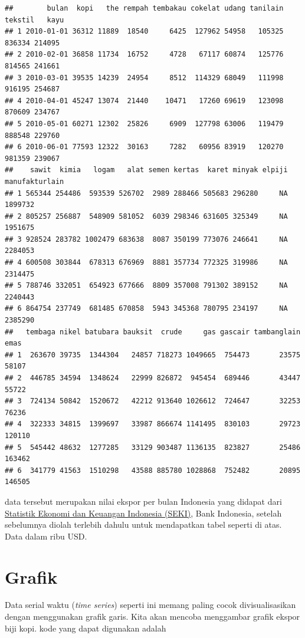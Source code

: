 \documentclass[
]{book}
\begin{document}
\begin{verbatim}
##        bulan  kopi   the rempah tembakau cokelat udang tanilain tekstil   kayu
## 1 2010-01-01 36312 11889  18540     6425  127962 54958   105325  836334 214095
## 2 2010-02-01 36858 11734  16752     4728   67117 60874   125776  814565 241661
## 3 2010-03-01 39535 14239  24954     8512  114329 68049   111998  916195 254687
## 4 2010-04-01 45247 13074  21440    10471   17260 69619   123098  870609 234767
## 5 2010-05-01 60271 12302  25826     6909  127798 63006   119479  888548 229760
## 6 2010-06-01 77593 12322  30163     7282   60956 83919   120270  981359 239067
##    sawit  kimia   logam   alat semen kertas  karet minyak elpiji manufakturlain
## 1 565344 254486  593539 526702  2989 288466 505683 296280     NA        1899732
## 2 805257 256887  548909 581052  6039 298346 631605 325349     NA        1951675
## 3 928524 283782 1002479 683638  8087 350199 773076 246641     NA        2284053
## 4 600508 303844  678313 676969  8881 357734 772325 319986     NA        2314475
## 5 788746 332051  654923 677666  8809 357008 791302 389152     NA        2240443
## 6 864754 237749  681485 670858  5943 345368 780795 234197     NA        2385290
##   tembaga nikel batubara bauksit  crude     gas gascair tambanglain   emas
## 1  263670 39735  1344304   24857 718273 1049665  754473       23575  58107
## 2  446785 34594  1348624   22999 826872  945454  689446       43447  55722
## 3  724134 50842  1520672   42212 913640 1026612  724647       32253  76236
## 4  322333 34815  1399697   33987 866674 1141495  830103       29723 120110
## 5  545442 48632  1277285   33129 903487 1136135  823827       25486 163462
## 6  341779 41563  1510298   43588 885780 1028868  752482       20895 146505
\end{verbatim}

data tersebut merupakan nilai ekspor per bulan Indonesia yang didapat dari \href{https://www.bi.go.id/id/statistik/seki/terkini/eksternal/Contents/Default.aspx}{Statistik Ekonomi dan Keuangan Indonesia (SEKI)}, Bank Indonesia, setelah sebelumnya diolah terlebih dahulu untuk mendapatkan tabel seperti di atas. Data dalam ribu USD.

\hypertarget{grafik}{%
\section{Grafik}\label{grafik}}

Data serial waktu (\emph{time series}) seperti ini memang paling cocok divisualisasikan dengan menggunakan grafik garis. Kita akan mencoba menggambar grafik ekspor biji kopi. kode yang dapat digunakan adalah
\end{document}
